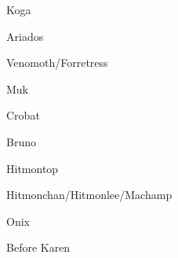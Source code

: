 \begin{paracol}{2}
\begin{boss}{Koga}
	\varwb
	\begin{fightSection}{Ariados}
		\item \xSpecial
		\item \xAccuracy
		\item {} \surf
	\end{fightSection}
	\begin{fightSection}{Venomoth/Forretress}
		\item {} \surf
	\end{fightSection}
	\begin{fightSection}{Muk}
		\item {} \return
		\item {} \surf
		\item {}
		\begin{notes}
			\item {}
		\end{notes}
	\end{fightSection}
	\begin{fightSection}{Crobat}
		\item {} \icePunch
	\end{fightSection}
	\varwe
\end{boss}

\begin{boss}{Bruno}
	\varwb
	\begin{fightSection}{Hitmontop}
		\item \xAttack{} 
		\item {} \return
	\end{fightSection}
	\begin{fightSection}{Hitmonchan/Hitmonlee/Machamp}
		\item {} \return{} 
	\end{fightSection}
	\begin{fightSection}{Onix}
		\item {} \icePunch
	\end{fightSection}
	\varwe
\end{boss}

\begin{menu}{Before Karen}
	\varwb
	\begin{packMenu}
		\item \fullRestore
	\end{packMenu}
	\varwe
\end{menu}


\end{paracol}

